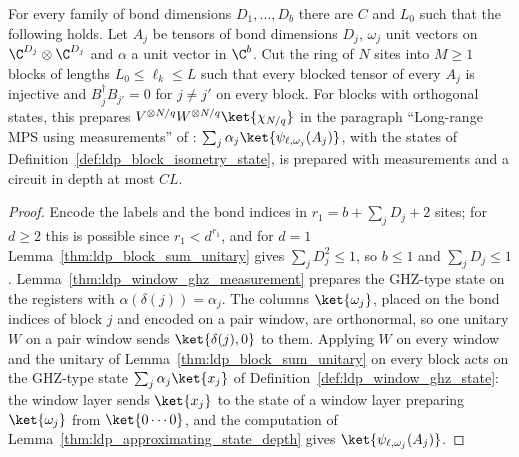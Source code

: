 \begin{lemma}
    \label{thm:ldp_orthogonal_blocks_measurement}
    \leanok
    For every family of bond dimensions $D_1,\dots,D_b$ there are $C$ and $L_0$
    such that the following holds. Let $A_j$ be tensors of bond dimensions $D_j$,
    $\omega_j$ unit vectors on $\C^{D_j}\otimes\C^{D_j}$ and $\alpha$ a unit
    vector in $\C^b$. Cut the ring of $N$ sites into $M\geq1$ blocks of lengths
    $L_0\leq\ell_k\leq L$ such that every blocked tensor of every $A_j$ is
    injective and $B_j^\dagger B_{j'}=0$ for $j\neq j'$ on every block. For
    blocks with orthogonal states, this prepares
    $V^{\otimes N/q}W^{\otimes N/q}\ket{\chi_{N/q}}$ in the paragraph
    ``Long-range MPS using measurements'' of \cite{Malz2024Preparation}:
    $\sum_j\alpha_j\ket{\psi_{\ell,\omega_j}(A_j)}$, with the states of
    Definition~\ref{def:ldp_block_isometry_state}, is prepared with
    measurements and a circuit in depth at most $CL$.
\end{lemma}
\begin{proof}
    \leanok
    Encode the labels and the bond indices in $r_1=b+\sum_jD_j+2$ sites; for
    $d\geq2$ this is possible since $r_1<d^{r_1}$, and for $d=1$
    Lemma~\ref{thm:ldp_block_sum_unitary} gives $\sum_jD_j^2\leq1$, so $b\leq1$
    and $\sum_jD_j\leq1$. Lemma~\ref{thm:ldp_window_ghz_measurement} prepares
    the GHZ-type state on the registers with $\alpha(\delta(j))=\alpha_j$.
    The columns $\ket{\omega_j}$, placed on the bond indices of block $j$ and
    encoded on a pair window, are orthonormal, so one unitary $W$ on a pair
    window sends $\ket{\delta(j),0}$ to them. Applying $W$ on every window and the
    unitary of Lemma~\ref{thm:ldp_block_sum_unitary} on every block acts on the
    GHZ-type state $\sum_j\alpha_j\ket{x_j}$ of
    Definition~\ref{def:ldp_window_ghz_state}: the window layer sends $\ket{x_j}$ to the state of
    a window layer preparing $\ket{\omega_j}$ from $\ket{0\cdots0}$, and the
    computation of Lemma~\ref{thm:ldp_approximating_state_depth} gives
    $\ket{\psi_{\ell,\omega_j}(A_j)}$.
\end{proof}

